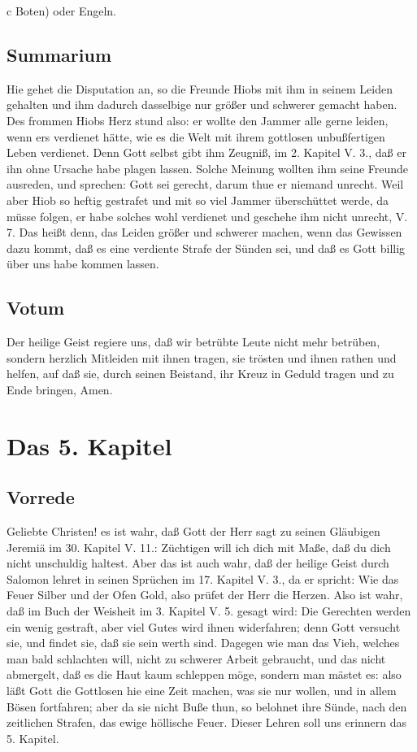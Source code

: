 c Boten) oder Engeln.

\section{Summarium}

Hie gehet die Disputation an, so die Freunde Hiobs mit ihm in seinem Leiden gehalten und ihm dadurch dasselbige nur größer und schwerer gemacht haben. Des frommen Hiobs Herz stund also: er wollte den Jammer alle gerne leiden, wenn ers verdienet hätte, wie es die Welt mit ihrem gottlosen unbußfertigen Leben verdienet. Denn Gott selbst gibt ihm Zeugniß, im 2. Kapitel V. 3., daß er ihn ohne Ursache habe plagen lassen. Solche Meinung wollten ihm seine Freunde ausreden, und sprechen: Gott sei gerecht, darum thue er niemand unrecht. Weil aber Hiob so heftig gestrafet und mit so viel Jammer überschüttet werde, da müsse folgen, er habe solches wohl verdienet und geschehe ihm nicht unrecht, V. 7. Das heißt denn, das Leiden größer und schwerer machen, wenn das Gewissen dazu kommt, daß es eine verdiente Strafe der Sünden sei, und daß es Gott billig über uns habe kommen lassen.

\section{Votum}

Der heilige Geist regiere uns, daß wir betrübte Leute nicht mehr betrüben, sondern herzlich Mitleiden mit ihnen tragen, sie trösten und ihnen rathen und helfen, auf daß sie, durch seinen Beistand, ihr Kreuz in Geduld tragen und zu Ende bringen, Amen.

\chapter{Das 5. Kapitel}

\section{Vorrede}

Geliebte Christen! es ist wahr, daß Gott der Herr sagt zu seinen Gläubigen Jeremiä im 30. Kapitel V. 11.: Züchtigen will ich dich mit Maße, daß du dich nicht unschuldig haltest. Aber das ist auch wahr, daß der heilige Geist durch Salomon lehret in seinen Sprüchen im 17. Kapitel V. 3., da er spricht: Wie das Feuer Silber und der Ofen Gold, also prüfet der Herr die Herzen. Also ist wahr, daß im Buch der Weisheit im 3. Kapitel V. 5. gesagt wird: Die Gerechten werden ein wenig gestraft, aber viel Gutes wird ihnen widerfahren; denn Gott versucht sie, und findet sie, daß sie sein werth sind. Dagegen wie man das Vieh, welches man bald schlachten will, nicht zu schwerer Arbeit gebraucht, und das nicht abmergelt, daß es die Haut kaum schleppen möge, sondern man mästet es: also läßt Gott die Gottlosen hie eine Zeit machen, was sie nur wollen, und in allem Bösen fortfahren; aber da sie nicht Buße thun, so belohnet ihre Sünde, nach den zeitlichen Strafen, das ewige höllische Feuer. Dieser Lehren soll uns erinnern das 5. Kapitel.

